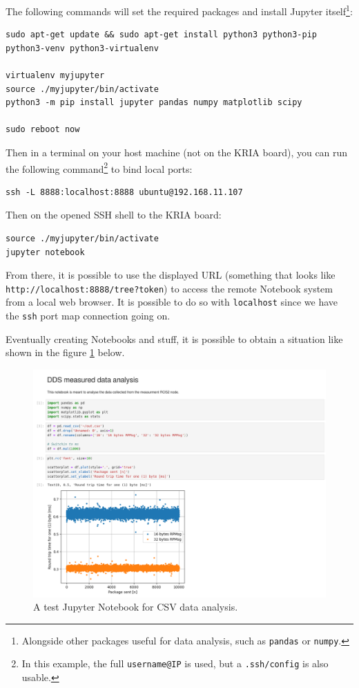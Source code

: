 \documentclass[10pt]{article}
\begin{document}
The following commands will set the required packages and install Jupyter itself\footnote{Alongside other packages useful for data analysis, such as \texttt{pandas} or \texttt{numpy}.}:
\begin{verbatim}
sudo apt-get update && sudo apt-get install python3 python3-pip python3-venv python3-virtualenv

virtualenv myjupyter
source ./myjupyter/bin/activate
python3 -m pip install jupyter pandas numpy matplotlib scipy

sudo reboot now
\end{verbatim}

Then in a terminal on your host machine (not on the KRIA board), you can run the following command\footnote{In this example, the full \texttt{username@IP} is used, but a \texttt{.ssh/config} is also usable.} to bind local ports:
\begin{verbatim}
ssh -L 8888:localhost:8888 ubuntu@192.168.11.107
\end{verbatim}

Then on the opened SSH shell to the KRIA board:
\begin{verbatim}
source ./myjupyter/bin/activate
jupyter notebook
\end{verbatim}

From there, it is possible to use the displayed URL (something that looks like
\texttt{http://localhost:8888/tree?token}) to access the remote Notebook system from a local web browser.
It is possible to do so with \texttt{localhost} since we have the \texttt{ssh} port map connection going on.

Eventually creating Notebooks and stuff, it is possible to obtain a situation like shown in the figure \ref{fig:orgbdb0404} below.

\begin{figure}[htbp]
\centering
\includegraphics[width=.6\textwidth]{img/jupyter.png}
\caption{\label{fig:orgbdb0404}A test Jupyter Notebook for CSV data analysis.}
\end{figure}
\end{document}
